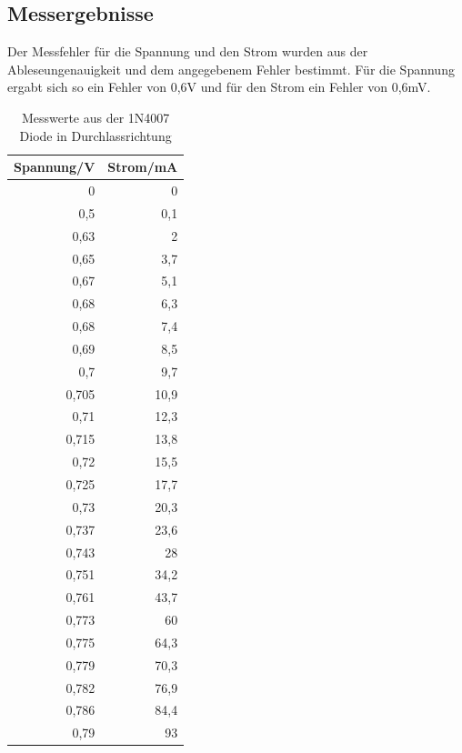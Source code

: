 \documentclass[12pt,a4paper]{article}
\begin{document}
\newpage

\subsection{Messergebnisse}

Der Messfehler für die Spannung und den Strom wurden aus der Ableseungenauigkeit und dem angegebenem Fehler bestimmt. Für die Spannung ergabt sich so ein Fehler von 0,6V und für den Strom ein Fehler von 0,6mV.

\begin{table}[H]
\centering
\caption{Messwerte aus der 1N4007 Diode in Durchlassrichtung}
\begin{tabular}{|r|r|}
\hline
\multicolumn{1}{|l|}{Spannung/V} & \multicolumn{1}{l|}{Strom/mA} \\ \hline
0 & 0 \\ \hline
0,5 & 0,1 \\ \hline
0,63 & 2 \\ \hline
0,65 & 3,7 \\ \hline
0,67 & 5,1 \\ \hline
0,68 & 6,3 \\ \hline
0,68 & 7,4 \\ \hline
0,69 & 8,5 \\ \hline
0,7 & 9,7 \\ \hline
0,705 & 10,9 \\ \hline
0,71 & 12,3 \\ \hline
0,715 & 13,8 \\ \hline
0,72 & 15,5 \\ \hline
0,725 & 17,7 \\ \hline
0,73 & 20,3 \\ \hline
0,737 & 23,6 \\ \hline
0,743 & 28 \\ \hline
0,751 & 34,2 \\ \hline
0,761 & 43,7 \\ \hline
0,773 & 60 \\ \hline
0,775 & 64,3 \\ \hline
0,779 & 70,3 \\ \hline
0,782 & 76,9 \\ \hline
0,786 & 84,4 \\ \hline
0,79 & 93 \\ \hline
\end{tabular}
\label{tab:a1_1}
\end{table}
\end{document}
